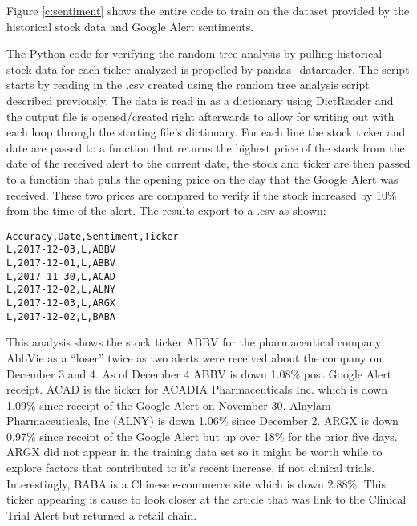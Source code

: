 \documentclass[sigconf]{acmart}
\begin{document}
Figure \ref{c:sentiment} shows the entire code to train on the dataset provided by the historical stock data and Google Alert sentiments.


The Python code for verifying the random tree analysis by pulling historical stock data for each ticker analyzed is propelled by pandas\_datareader. The script starts by reading in the .csv created using the random tree analysis script described previously. The data is read in as a dictionary using DictReader and the output file is opened/created right afterwards to allow for writing out with each loop through the starting file's dictionary. For each line the stock ticker and date are passed to a function that returns the highest price of the stock from the date of the received alert to the current date, the stock and ticker are then passed to a function that pulls the opening price on the day that the Google Alert was received. These two prices are compared to verify if the stock increased by 10\% from the time of the alert. The results export to a .csv as shown:
\begin{mdframed}[style=default]
\begin{lstlisting}
Accuracy,Date,Sentiment,Ticker
L,2017-12-03,L,ABBV
L,2017-12-01,L,ABBV
L,2017-11-30,L,ACAD
L,2017-12-02,L,ALNY
L,2017-12-03,L,ARGX
L,2017-12-02,L,BABA
\end{lstlisting}
\end{mdframed}
This analysis shows the stock ticker ABBV for the pharmaceutical company AbbVie as a ``loser'' twice as two alerts were received about the company on December 3 and 4. As of December 4 ABBV is down 1.08\% post Google Alert receipt. ACAD is the ticker for ACADIA Pharmaceuticals Inc. which is down 1.09\% since receipt of the Google Alert on November 30. Alnylam Pharmaceuticals, Inc (ALNY) is down 1.06\% since December 2. ARGX is down 0.97\% since receipt of the Google Alert but up over 18\% for the prior five days. ARGX did not appear in the training data set so it might be worth while to explore factors that contributed to it's recent increase, if not clinical trials. Interestingly, BABA is a Chinese e-commerce site which is down 2.88\%. This ticker appearing is cause to look closer at the article that was link to the Clinical Trial Alert but returned a retail chain.
\end{document}
